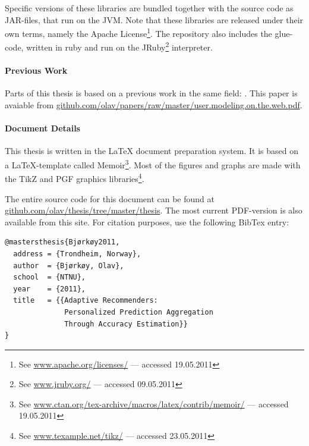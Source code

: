 Specific versions of these libraries are bundled together with
the source code as JAR-files, that run on the JVM.
Note that these libraries are released under their own terms,
namely the Apache License\footnote{
See \url{www.apache.org/licenses/} --- accessed 19.05.2011}.
The repository also includes the glue-code, written in ruby and run on the JRuby\footnote{
See \url{www.jruby.org/} --- accessed 09.05.2011} interpreter.

\paragraph{Previous Work}
Parts of this thesis is based on a previous work in the same field:
\cite{Bjorkoy2010d}. This paper is avaiable from
\url{github.com/olav/papers/raw/master/user.modeling.on.the.web.pdf}.

\paragraph{Document Details}
This thesis is written in the LaTeX document preparation system.
It is based on a LaTeX-template called Memoir\footnote{
See \url{www.ctan.org/tex-archive/macros/latex/contrib/memoir/} --- accessed 19.05.2011}.
Most of the figures and graphs are made with the TikZ and PGF graphics libraries\footnote{
See \url{www.texample.net/tikz/} --- accessed 23.05.2011}.

The entire source code for this document can be found at 
\url{github.com/olav/thesis/tree/master/thesis}.
The most current PDF-version is also available from this site.
For citation purposes, use the following BibTex entry:

{
\footnotesize
\begin{verbatim}
@mastersthesis{Bjørkøy2011,
  address = {Trondheim, Norway},
  author  = {Bjørkøy, Olav},
  school  = {NTNU},
  year    = {2011},
  title   = {{Adaptive Recommenders: 
              Personalized Prediction Aggregation
              Through Accuracy Estimation}}
} 
\end{verbatim}
}

